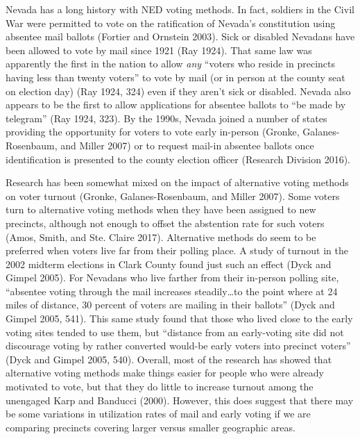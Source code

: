 \documentclass[12pt]{article}
\begin{document}
Nevada has a long history with NED voting methods. In fact, soldiers in the Civil War were permitted to vote on the ratification of Nevada's constitution using absentee mail ballots (Fortier and Ornstein 2003). Sick or disabled Nevadans have been allowed to vote by mail since 1921 (Ray 1924). That same law was apparently the first in the nation to allow \emph{any} ``voters who reside in precincts having less than twenty voters'' to vote by mail (or in person at the county seat on election day) (Ray 1924, 324) even if they aren't sick or disabled. Nevada also appears to be the first to allow applications for absentee ballots to ``be made by telegram'' (Ray 1924, 323). By the 1990s, Nevada joined a number of states providing the opportunity for voters to vote early in-person (Gronke, Galanes-Rosenbaum, and Miller 2007) or to request mail-in absentee ballots once identification is presented to the county election officer (Research Division 2016).

Research has been somewhat mixed on the impact of alternative voting methods on voter turnout (Gronke, Galanes-Rosenbaum, and Miller 2007). Some voters turn to alternative voting methods when they have been assigned to new precincts, although not enough to offset the abstention rate for such voters (Amos, Smith, and Ste. Claire 2017). Alternative methods do seem to be preferred when voters live far from their polling place. A study of turnout in the 2002 midterm elections in Clark County found just such an effect (Dyck and Gimpel 2005). For Nevadans who live farther from their in-person polling site, ``absentee voting through the mail increases steadily\ldots to the point where at 24 miles of distance, 30 percent of voters are mailing in their ballots'' (Dyck and Gimpel 2005, 541). This same study found that those who lived close to the early voting sites tended to use them, but ``distance from an early-voting site did not discourage voting by rather converted would-be early voters into precinct voters'' (Dyck and Gimpel 2005, 540). Overall, most of the research has showed that alternative voting methods make things easier for people who were already motivated to vote, but that they do little to increase turnout among the unengaged Karp and Banducci (2000). However, this does suggest that there may be some variations in utilization rates of mail and early voting if we are comparing precincts covering larger versus smaller geographic areas.
\end{document}
